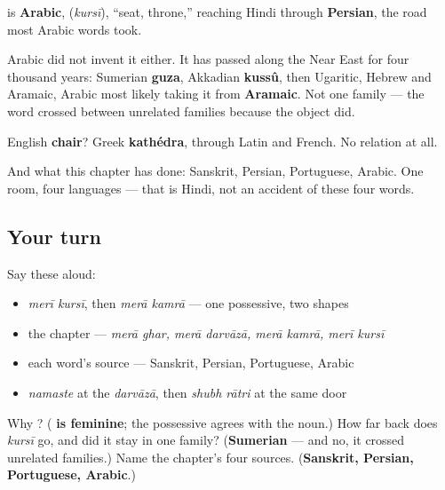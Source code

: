 \begin{cousinweb}
\textbf{} is \textbf{Arabic}, \textbf{} (\emph{kursī}), \textquotedblleft{}seat, throne,\textquotedblright{} reaching Hindi through \textbf{Persian}, the road most Arabic words took.

Arabic did not invent it either. It has passed along the Near East for four thousand years: Sumerian \textbf{guza}, Akkadian \textbf{kussû}, then Ugaritic, Hebrew and Aramaic, Arabic most likely taking it from \textbf{Aramaic}. Not one family — the word crossed between unrelated families because the object did.

English \textbf{chair}? Greek \textbf{kathédra}, through Latin and French. No relation at all.

And what this chapter has done: \textbf{} Sanskrit, \textbf{} Persian, \textbf{} Portuguese, \textbf{} Arabic. One room, four languages — that is Hindi, not an accident of these four words.
\end{cousinweb}

\subsection*{Your turn}
Say these aloud:

\begin{itemize}
\raggedright
  \item \emph{merī kursī}, then \emph{merā kamrā} — one possessive, two shapes
  \item the chapter — \emph{merā ghar, merā darvāzā, merā kamrā, merī kursī}
  \item each word's source — Sanskrit, Persian, Portuguese, Arabic
  \item \emph{namaste} at the \emph{darvāzā}, then \emph{shubh rātri} at the same door
\end{itemize}

\begin{tcolorbox}[breakable,colback=teal!4,colframe=teal!35!black,title={Before you move on}]
Why \textbf{ }? (\textbf{ is feminine}; the possessive agrees with the noun.) How far back does \emph{kursī} go, and did it stay in one family? (\textbf{Sumerian} — and no, it crossed unrelated families.) Name the chapter's four sources. (\textbf{Sanskrit, Persian, Portuguese, Arabic}.)
\end{tcolorbox}
